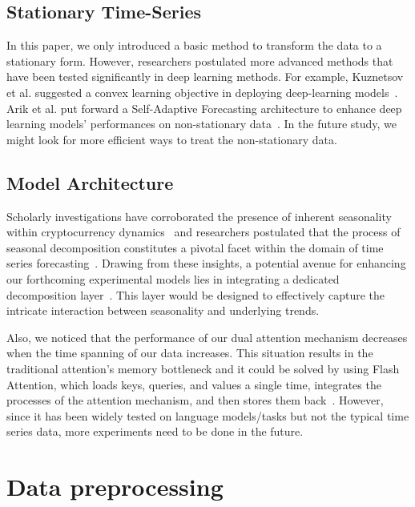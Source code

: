 \subsection{Stationary Time-Series}
In this paper, we only introduced a basic method to transform the data to a stationary form. However, researchers postulated more advanced methods that have been tested significantly in deep learning methods. For example, Kuznetsov et al. suggested a convex learning objective in deploying deep-learning models~\cite{kuznetsov2020discrepancy}. Arik et al. put forward a Self-Adaptive Forecasting architecture to enhance deep learning models' performances on non-stationary data~\cite{arik2022self}. In the future study, we might look for more efficient ways to treat the non-stationary data.

\subsection{Model Architecture}
Scholarly investigations have corroborated the presence of inherent seasonality within cryptocurrency dynamics~\cite{kaiser2019seasonality} and researchers postulated that the process of seasonal decomposition constitutes a pivotal facet within the domain of time series forecasting~\cite{wen2020fast}. Drawing from these insights, a potential avenue for enhancing our forthcoming experimental models lies in integrating a dedicated decomposition layer~\cite{bandara2020lstm}. This layer would be designed to effectively capture the intricate interaction between seasonality and underlying trends. 

Also, we noticed that the performance of our dual attention mechanism decreases when the time spanning of our data increases. This situation results in the traditional attention's memory bottleneck and it could be solved by using Flash Attention, which loads keys, queries, and values a single time, integrates the processes of the attention mechanism, and then stores them back~\cite{dao2022flashattention}. However, since it has been widely tested on language models/tasks but not the typical time series data, more experiments need to be done in the future. 




\newpage 	

\appendix
\label{appendix}
\setcounter{section}{0}
\section{Data preprocessing}

